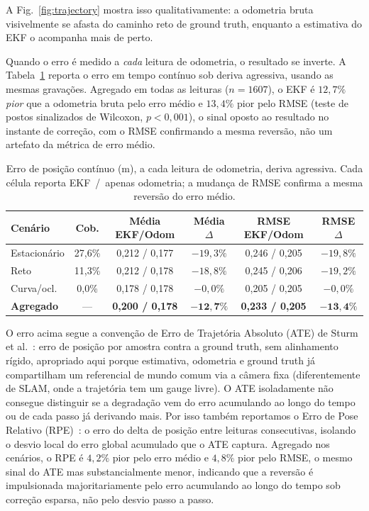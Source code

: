 \documentclass[runningheads]{llncs}
\renewcommand{\paragraph}[1]{\vspace{4pt}\noindent{\em #1}\enspace}
\begin{document}
A Fig.~\ref{fig:trajectory} mostra isso qualitativamente: a odometria
bruta visivelmente se afasta do caminho reto de ground truth, enquanto
a estimativa do EKF o acompanha mais de perto.

\paragraph{Erro contínuo: o achado central.}
Quando o erro é medido a \emph{cada} leitura de odometria, o resultado
se inverte. A Tabela~\ref{tab:continuous-error} reporta o erro em
tempo contínuo sob deriva agressiva, usando as mesmas gravações.
Agregado em todas as leituras ($n=1607$), o EKF é $12,7\%$ \emph{pior}
que a odometria bruta pelo erro médio e $13,4\%$ pior pelo RMSE (teste
de postos sinalizados de Wilcoxon, $p<0,001$), o sinal oposto ao
resultado no instante de correção, com o RMSE confirmando a mesma
reversão, não um artefato da métrica de erro médio.

\begin{table}
\caption{Erro de posição contínuo (m), a cada leitura de odometria,
deriva agressiva. Cada célula reporta EKF~/~apenas odometria; a
mudança de RMSE confirma a mesma reversão do erro médio.}\label{tab:continuous-error}
\footnotesize
\begin{tabular}{|l|c|c|c|c|c|}
\hline
\textbf{Cenário} & \textbf{Cob.} & \textbf{Média EKF/Odom} & \textbf{Média $\Delta$} & \textbf{RMSE EKF/Odom} & \textbf{RMSE $\Delta$} \\
\hline
Estacionário & 27,6\% & 0,212 / 0,177 & $-19,3\%$ & 0,246 / 0,205 & $-19,8\%$ \\
\hline
Reto & 11,3\% & 0,212 / 0,178 & $-18,8\%$ & 0,245 / 0,206 & $-19,2\%$ \\
\hline
Curva/ocl. & 0,0\% & 0,178 / 0,178 & $-0,0\%$ & 0,205 / 0,205 & $-0,0\%$ \\
\hline
\textbf{Agregado} & --- & \textbf{0,200 / 0,178} & $\mathbf{-12,7\%}$ & \textbf{0,233 / 0,205} & $\mathbf{-13,4\%}$ \\
\hline
\end{tabular}
\end{table}

O erro acima segue a convenção de Erro de Trajetória Absoluto (ATE) de
Sturm et al.~\cite{sturm2012tum}: erro de posição por amostra contra a
ground truth, sem alinhamento rígido, apropriado aqui porque
estimativa, odometria e ground truth já compartilham um referencial de
mundo comum via a câmera fixa (diferentemente de SLAM, onde a
trajetória tem um gauge livre). O ATE isoladamente não consegue
distinguir se a degradação vem do erro acumulando ao longo do tempo ou
de cada passo já derivando mais. Por isso também reportamos o Erro de
Pose Relativo (RPE)~\cite{sturm2012tum}: o erro do delta de posição
entre leituras consecutivas, isolando o desvio local do erro global
acumulado que o ATE captura. Agregado nos cenários, o RPE é $4,2\%$
pior pelo erro médio e $4,8\%$ pior pelo RMSE, o mesmo sinal do ATE
mas substancialmente menor, indicando que a reversão é impulsionada
majoritariamente pelo erro acumulando ao longo do tempo sob correção
esparsa, não pelo desvio passo a passo.
\end{document}
